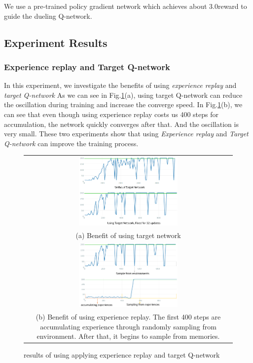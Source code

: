 %
We use a pre-trained policy gradient network which achieves about $3.0$reward to guide the dueling Q-network.


\subsection{Experiment Results}


\subsubsection{Experience replay and Target Q-network}

In this experiment, we investigate the benefits of using \textit{experience replay} and \textit{target Q-network}
%
As we can see in Fig.\ref{fig:ep_target_q_result}(a), using target Q-network can reduce the oscillation during training and increase the converge speed.
%
In Fig.\ref{fig:ep_target_q_result}(b), we can see that even though using experience replay costs us 400 steps for accumulation, the network quickly converges after that. And the oscillation is very small.
%
These two experiments show that using \textit{Experience replay} and \textit{Target Q-network} can improve the training process.

\begin{figure}[ht!]
	\centering
	\begin{tabular}{c}
		\includegraphics[width=0.49\textwidth]{./fig/target_network_result.png} \\
		(a) Benefit of using target network \\
		\includegraphics[width=0.49\textwidth]{./fig/er_result.png} \\
		(b) Benefit of using experience replay. The first 400 steps are accumulating experience through randomly sampling from environment. After that, it begins to sample from memories.\\
	\end{tabular}
	\caption{results of using applying experience replay and target Q-network}
	\label{fig:ep_target_q_result}
\end{figure}



